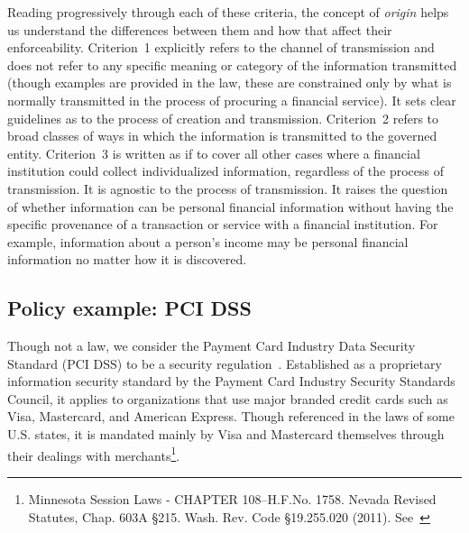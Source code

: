 \documentclass[../thesis.tex]{subfiles}
\begin{document}
Reading progressively through each of these
criteria, the concept of \emph{origin} 
helps us understand the differences between
them and how that affect their enforceability.
Criterion~1 explicitly refers to the channel
of transmission and does not refer 
to any specific meaning or category of
the information transmitted 
(though examples are provided in the law, these are
constrained only by what is normally 
transmitted in the process of
procuring a financial service).
It sets clear guidelines as to the
process of creation and transmission.
Criterion~2 refers to broad classes of
ways in which the information is transmitted 
to the governed entity.
Criterion~3 is written as if to cover all other 
cases where a financial institution could 
collect individualized information, 
regardless of the process of transmission. 
It is agnostic to the process of transmission. 
It raises the question of whether information can be
personal financial information without having the specific
provenance of a transaction or service with a
financial institution.
For example, information about a person's income may be
personal financial information no matter how it is discovered.

%

\subsection{Policy example: PCI DSS}
\label{sec:pci-dss}

Though not a law, we consider the Payment Card Industry 
Data Security Standard (PCI DSS) to be a 
security regulation~\cite{bradleypayment}.
Established as a proprietary information security standard 
by the Payment Card Industry Security Standards Council, 
it applies to organizations that use
major branded credit cards such as Visa, Mastercard, 
and American Express.
Though referenced in the laws of some U.S. states, it is 
mandated mainly by Visa and Mastercard themselves through 
their dealings with 
merchants\footnote{Minnesota Session Laws - 
CHAPTER 108--H.F.No. 1758. Nevada Revised Statutes, Chap. 
603A \S 215. Wash. Rev. Code \S 19.255.020 (2011). 
See~\cite{pcisecuritystandardscouncilFAQ}}.
\end{document}

